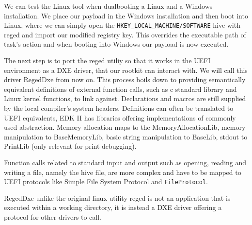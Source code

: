 We can test the Linux tool when dualbooting a Linux and a Windows installation. We place our payload in the Windows installation and then boot into Linux, where we can simply open the \lstinline{HKEY_LOCAL_MACHINE/SOFTWARE} hive with reged and import our modified registry key.
This overrides the executable path of task's action and when booting into Windows our payload is now executed.


The next step is to port the reged utiliy so that it works in the UEFI environment as a DXE driver, that our rootkit can interact with. We will call this driver RegedDxe from now on.
This process boils down to providing semantically equivalent definitions of external function calls, such as c standard library and Linux kernel functions, to link against. Declarations and macros are still supplied by the local compiler's system headers. Definitions can often be translated to UEFI equivalents, EDK II has libraries offering implementations of commonly used abstraction.
Memory allocation maps to the MemoryAllocationLib, memory manipulation to BaseMemoryLib, basic string manipulation to BaseLib, stdout to PrintLib (only relevant for print debugging).

Function calls related to standard input and output such as opening, reading and writing a file, namely the hive file, are more complex and have to be mapped to UEFI protocols like Simple File System Protocol and \lstinline{FileProtocol}.


RegedDxe unlike the original linux utility reged is not an application that is executed within a working directory, it is instead a DXE driver offering a protocol for other drivers to call.



